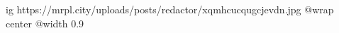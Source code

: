  
 
 
 
 

\ifcmt
  ig https://mrpl.city/uploads/posts/redactor/xqmhcucqugcjevdn.jpg
  @wrap center
  @width 0.9
\fi
